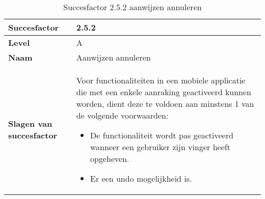 \begin{table}[H]
    \centering
    \caption{Succesfactor 2.5.2 aanwijzen annuleren}
    
    
    \hspace*{-1cm}\begin{tabular}{|l|p{12cm}|} 
        \hline
        \textbf{Succesfactor}                 & 2.5.2                                                                                                                                                                                                                                                                                                                                                                                                                                                                                                        \\ 
        \hline
        \textbf{Level}                        & A                                                                                                                                                                                                                                                                                                                                                                                                                                                                                                               \\ 
        \hline
        \textbf{Naam}                         & Aanwijzen annuleren~                                                                                                                                                                                                                                                                                                                                                                                                                                                                                      \\ 
        \hline
        \textbf{Slagen van succesfactor}      & Voor functionaliteiten in een mobiele applicatie  die met een enkele aanraking geactiveerd kunnen worden, dient deze te voldoen aan minstens 1 van de volgende voorwaarden:
        \begin{itemize}
            \item De functionaliteit wordt pas geactiveerd wanneer een gebruiker zijn vinger heeft opgeheven.
            \item Er een undo mogelijkheid is.

\end{itemize}
\end{tabular}
\end{table}
